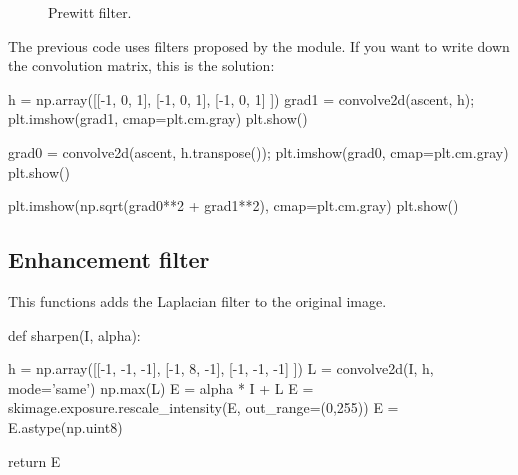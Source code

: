 \begin{figure}[H]
\centering\caption{Prewitt filter.}
\hspace{1.5cm}
\label{fig:introduction:python:prewitt}
\end{figure}

The previous code uses filters proposed by the  module. If you want to write down the convolution matrix, this is the solution:
\begin{python}
h = np.array([[-1, 0, 1], [-1, 0, 1], [-1, 0, 1] ])
grad1 = convolve2d(ascent, h);
plt.imshow(grad1, cmap=plt.cm.gray)
plt.show()

grad0 = convolve2d(ascent, h.transpose());
plt.imshow(grad0, cmap=plt.cm.gray)
plt.show()

plt.imshow(np.sqrt(grad0**2 + grad1**2), cmap=plt.cm.gray)
plt.show()
\end{python}


\subsection{Enhancement filter}

This functions adds the Laplacian filter to the original image.
\begin{python}
def sharpen(I, alpha):
    
    h = np.array([[-1, -1, -1], [-1, 8, -1], [-1, -1, -1] ])
    L = convolve2d(I, h, mode='same')
    np.max(L)
    E = alpha * I + L
    E = skimage.exposure.rescale_intensity(E, out_range=(0,255))
    E = E.astype(np.uint8)
    
    return E
\end{python}

